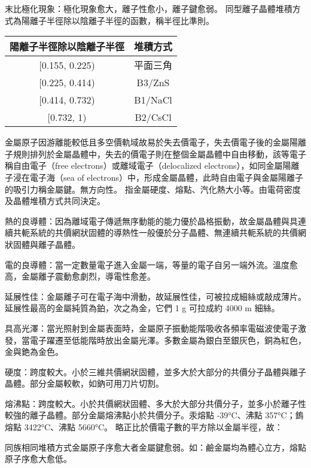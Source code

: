 \documentclass[a4paper,12pt]{report}
\begin{document}
\item 末比極化現象：極化現象愈大，離子性愈小，離子鍵愈弱。
\eit
{}
同型離子晶體堆積方式為陽離子半徑除以陰離子半徑的函數，稱半徑比準則。
\begin{longtable}[c]{|c|c|}
\hline
陽離子半徑除以陰離子半徑 & 堆積方式 \\\hline\endhead
[0.155, 0.225) & 平面三角 \\\hline
[0.225, 0.414) & B3/ZnS \\\hline
[0.414, 0.732) & B1/NaCl \\\hline
[0.732, 1) & B2/CsCl \\\hline
\end{longtable}\FB


金屬原子因游離能較低且多空價軌域故易於失去價電子，失去價電子後的金屬陽離子規則排列於金屬晶體中，失去的價電子則在整個金屬晶體中自由移動，該等電子稱自由電子（free electrons）或離域電子（delocalized electrons），如同金屬陽離子浸在電子海（sea of electrons）中，形成金屬晶體，此時自由電子與金屬陽離子的吸引力稱金屬鍵。無方向性。
指金屬硬度、熔點、汽化熱大小等。由電荷密度及晶體堆積方式共同決定。
\bit
\item 熱的良導體：因為離域電子傳遞無序動能的能力優於晶格振動，故金屬晶體與具連續共軛系統的共價網狀固體的導熱性一般優於分子晶體、無連續共軛系統的共價網狀固體與離子晶體。
\item 電的良導體：當一定數量電子進入金屬一端，等量的電子自另一端外流。溫度愈高，金屬離子震動愈劇烈，導電性愈差。
\item 延展性佳：金屬離子可在電子海中滑動，故延展性佳，可被拉成細絲或敲成薄片。延展性最高的金屬純質為鉑，次之為金，它們 1 g 可拉成約 4000 m 細絲。
\item 具高光澤：當光照射到金屬表面時，金屬原子振動能階吸收各頻率電磁波使電子激發，當電子躍遷至低能階時放出金屬光澤。多數金屬為銀白至銀灰色，銅為紅色，金與銫為金色。
\item 硬度：跨度較大。小於三維共價網狀固體，並多大於大部分的共價分子晶體與離子晶體。部分金屬較軟，如鈉可用刀片切割。
\item 熔沸點：跨度較大。小於共價網狀固體、多大於大部分共價分子，並多小於離子性較強的離子晶體。部分金屬熔沸點小於共價分子。汞熔點 -39°C、沸點 357°C；鎢熔點 3422°C、沸點 5660°C。
\eit
{}
略正比於價電子數的平方除以金屬半徑，故：
\bit
\item 同族相同堆積方式金屬原子序愈大者金屬鍵愈弱。如：鹼金屬均為體心立方，熔點原子序愈大愈低。
\end{document}
